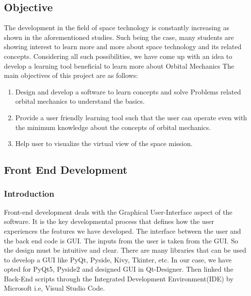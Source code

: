 \documentclass[12pt]{article}
\begin{document}
\subsection{Objective}
The development in the field of space technology is constantly increasing as shown in the aforementioned studies.
Such being the case, many students are showing interest to learn more and more about space technology and its related concepts. Considering all such possibilities, we have come up with an idea to develop a learning tool beneficial to learn more about Orbital Mechanics 
The main objectives of this project are as follows:
\begin{enumerate}
\item Design and develop a software to learn concepts and  solve Problems related orbital mechanics to understand the basics.
\item Provide a user friendly learning tool such that the user can operate even with the minimum knowledge about the concepts of orbital mechanics.
\item Help user to visualize the virtual view of the space mission.
\end{enumerate}
\subsection{Front End Development}
\subsubsection{Introduction}
Front-end development deals with the Graphical User-Interface aspect of the software. It is the key developmental process that defines how the user experiences the features we have developed. The interface between the user and the back end code is GUI. The inputs from the user is taken from the GUI. So the design must be intuitive and clear. There are many libraries that can be used to develop a GUI like PyQt, Pyside, Kivy, Tkinter, etc. In our case, we have opted for PyQt5, Pyside2 and designed GUI in Qt-Designer. Then linked the Back-End scripts through the Integrated Development Environment(IDE) by Microsoft i.e, Visual Studio Code.
\end{document}
